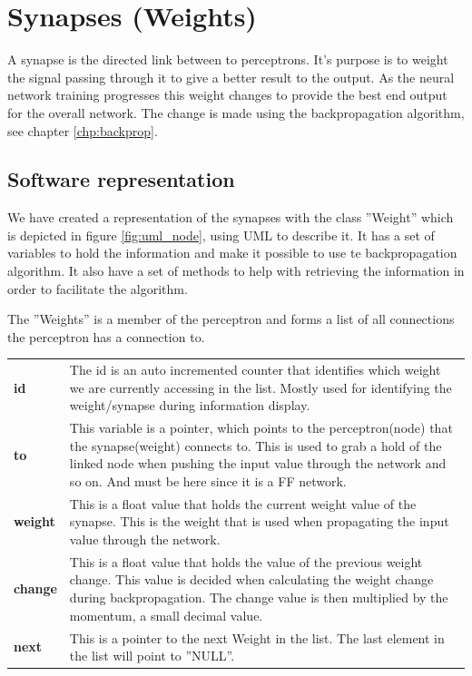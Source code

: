 \section{Synapses (Weights)}
A \gls{synapse} is the directed link between to \gls{perceptron}s. It's purpose
is to weight the signal passing through it to give a better result to the
output. As the neural network training progresses this weight changes to provide
the best end output for the overall network.  The change is made using the
backpropagation algorithm, see chapter \ref{chp:backprop}.


\subsection{Software representation}
We have created a representation of the synapses with the class ''Weight'' which
is depicted in figure \ref{fig:uml_node}, using UML to describe it.  It has a
set of variables to hold the information and make it possible to use te
backpropagation algorithm. It also have a set of methods to help with retrieving
the information in order to facilitate the algorithm.

The ''Weights'' is a member of the perceptron and forms a list of all
connections the perceptron has a connection to.

\begin{longtable}{ p{}  p{} }
\textbf{id} &			The id is an auto incremented counter that identifies which
	weight we are currently accessing in the list. Mostly used for identifying
	the weight/synapse during information display. \\
\textbf{to} &			This variable is a pointer, which points to the perceptron(node)
	that the synapse(weight) connects to. This is used to grab a hold of the
	linked node when pushing the input value through the network and so on. And
	must be here since it is a \gls{FF} network. \\
\textbf{weight} &	This is a float value that holds the current weight value of the
	synapse. This is the weight that is used when propagating the input value
	through the network.\\
\textbf{change} &	This is a float value that holds the value of the previous
	weight change. This value is decided when calculating the weight change
	during backpropagation. The change value is then multiplied by the momentum, a
	small decimal value.\\
\textbf{next} &		This is a pointer to the next Weight in the list. The last
	element in the list will point to ''NULL''.\\
\end{longtable}


